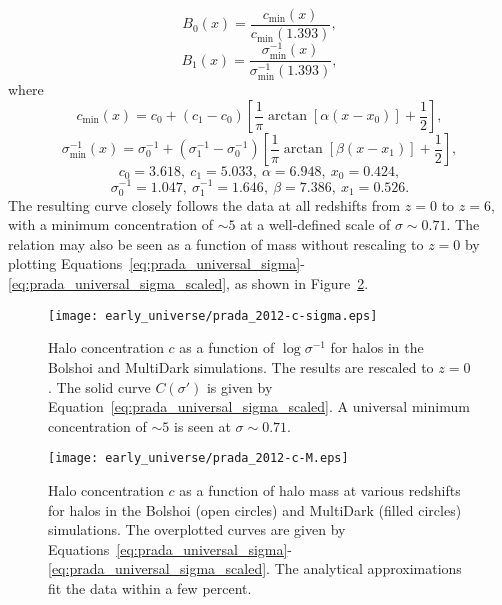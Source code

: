 \begin{equation}
	B_{0}(x) = \frac{c_{\min}(x)}{c_{\min}(1.393)},
\end{equation}
\begin{equation}
	B_{1}(x) = \frac{\sigma^{-1}_{\min}(x)}{\sigma^{-1}_{\min}(1.393)},
\end{equation}
where
\begin{equation}
	c_{\min}(x) = c_{0} + (c_{1} - c_{0}) \left[ \frac{1}{\pi} \arctan[\alpha(x - x_{0})] + \frac{1}{2} \right],
\end{equation}
\begin{equation}
	\sigma^{-1}_{\min}(x) = \sigma^{-1}_{0} + (\sigma^{-1}_{1} - \sigma^{-1}_{0}) \left[ \frac{1}{\pi} \arctan[\beta(x - x_{1})] + \frac{1}{2} \right],
\end{equation}
\begin{equation}
	c_{0} = 3.618,\ c_{1} = 5.033,\ \alpha = 6.948,\ x_{0} = 0.424,
\end{equation}
\begin{equation}
	\sigma^{-1}_{0} = 1.047,\ \sigma^{-1}_{1} = 1.646,\ \beta = 7.386,\ x_{1} = 0.526.
\end{equation}
The resulting curve closely follows the data at all redshifts from $z = 0$ to $z = 6$, with a minimum concentration of $\sim 5$ at a well-defined scale of $\sigma \sim 0.71$.  The relation may also be seen as a function of mass without rescaling to $z = 0$ by plotting Equations~\ref{eq:prada_universal_sigma}-\ref{eq:prada_universal_sigma_scaled}, as shown in Figure~\ref{fig:concentration--prada_c_M}.

\begin{figure}[tp]
	\centering
	\texttt{[image: early\_universe/prada\_2012-c-sigma.eps]}
	\caption[Halo concentration $c$ as a function of $\log \sigma^{-1}$]{\footnotesize Halo concentration $c$ as a function of $\log \sigma^{-1}$ for halos in the Bolshoi and MultiDark simulations.  The results are rescaled to $z = 0$.  The solid curve $C(\sigma')$ is given by Equation~\ref{eq:prada_universal_sigma_scaled}.  A universal minimum concentration of $\sim 5$ is seen at $\sigma \sim 0.71$.  \citep{2012MNRAS.423.3018P}}
	\label{fig:concentration--prada_c_sigma}
\end{figure}

\begin{figure}[tp]
	\centering
	\texttt{[image: early\_universe/prada\_2012-c-M.eps]}
	\caption[Halo concentration $c$ as a function of halo mass]{\footnotesize Halo concentration $c$ as a function of halo mass at various redshifts for halos in the Bolshoi (open circles) and MultiDark (filled circles) simulations.  The overplotted curves are given by Equations~\ref{eq:prada_universal_sigma}-\ref{eq:prada_universal_sigma_scaled}.  The analytical approximations fit the data within a few percent.  \citep{2012MNRAS.423.3018P}}
	\label{fig:concentration--prada_c_M}
\end{figure}




